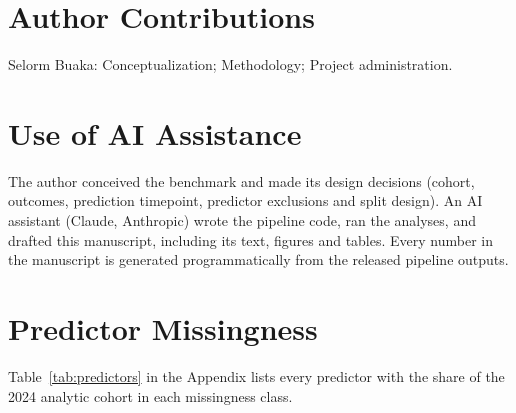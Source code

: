 \documentclass[journal]{IEEEtran}
\begin{document}
\section*{Author Contributions}
Selorm Buaka: Conceptualization; Methodology; Project administration.

\section*{Use of AI Assistance}
The author conceived the benchmark and made its design decisions (cohort, outcomes, prediction timepoint, predictor exclusions and split design). An AI assistant (Claude, Anthropic) wrote the pipeline code, ran the analyses, and drafted this manuscript, including its text, figures and tables. Every number in the manuscript is generated programmatically from the released pipeline outputs.




\appendices
\section{Predictor Missingness}
Table~\ref{tab:predictors} in the Appendix lists every predictor with the share of the 2024 analytic cohort in each missingness class.
\end{document}
